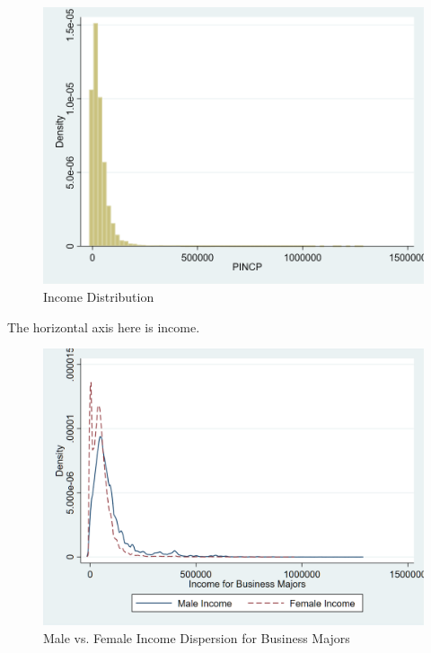 \documentclass[12pt]{article}
\begin{document}
\begin{figure}[H]
\centering
\caption{Income Distribution}
\includegraphics[scale=0.35]{income.png}
\end{figure}
\begin{center}
\footnotesize The horizontal axis here is income.
\end{center}
\begin{figure}[H]
\centering
\caption{Male vs. Female Income Dispersion for Business Majors}
\includegraphics[scale=0.27]{business.png}
\end{figure}
\end{document}
